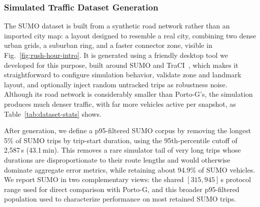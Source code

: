 \documentclass[pdflatex,sn-basic,Numbered]{sn-jnl}%
\begin{document}
\subsubsection{Simulated Traffic Dataset Generation}
The SUMO dataset is built from a synthetic road network rather than an imported city map: a layout designed to resemble a real city, combining two dense urban grids, a suburban ring, and a faster connector zone, visible in Fig.~\ref{fig:rush-hour-intro}. It is generated using a friendly desktop tool we developed for this purpose, built around SUMO and TraCI~\cite{SUMO2018,sumo_data_generator}, which makes it straightforward to configure simulation behavior, validate zone and landmark layout, and optionally inject random untracked trips as robustness noise. Although its road network is considerably smaller than Porto-G's, the simulation produces much denser traffic, with far more vehicles active per snapshot, as Table~\ref{tab:dataset-stats} shows.

After generation, we define a p95-filtered SUMO corpus by removing the longest 5\% of SUMO trips by trip-start duration, using the 95th-percentile cutoff of 2{,}587\,s (43.1\,min). This removes a rare simulator tail of very long trips whose durations are disproportionate to their route lengths and would otherwise dominate aggregate error metrics, while retaining about 94.9\% of SUMO vehicles. We report SUMO in two complementary views: the shared $[315,945]$\,s protocol range used for direct comparison with Porto-G, and this broader p95-filtered population used to characterize performance on most retained SUMO trips.
\end{document}
